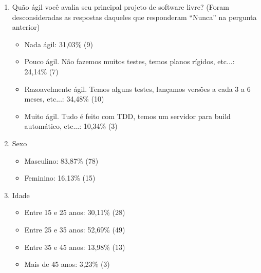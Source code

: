 \begin{enumerate}
\item Quão ágil você avalia seu principal projeto de software livre?
  (Foram desconsideradas as respostas daqueles que responderam
  ``Nunca'' na pergunta anterior)
  \begin{itemize}
  \item Nada ágil: 31,03\% (9)
  \item Pouco ágil. Não fazemos muitos testes, temos planos rígidos,
    etc...: 24,14\% (7)
  \item Razoavelmente ágil. Temos alguns testes, lançamos versões a
    cada 3 a 6 meses, etc...: 34,48\% (10)
  \item Muito ágil. Tudo é feito com TDD, temos um servidor para build
    automático, etc...: 10,34\% (3)
  \end{itemize}

\item Sexo
  \begin{itemize}
  \item Masculino: 83,87\% (78)
  \item Feminino: 16,13\% (15)
  \end{itemize}

\item Idade
  \begin{itemize}
  \item Entre 15 e 25 anos: 30,11\% (28)
  \item Entre 25 e 35 anos: 52,69\% (49)
  \item Entre 35 e 45 anos: 13,98\% (13)
  \item Mais de 45 anos: 3,23\% (3)
  \end{itemize}
\end{enumerate}
